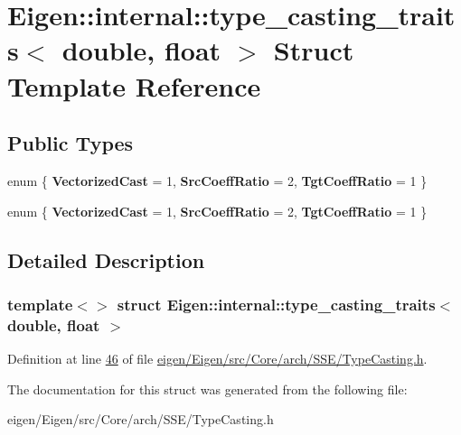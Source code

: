 \hypertarget{struct_eigen_1_1internal_1_1type__casting__traits_3_01double_00_01float_01_4}{}\section{Eigen\+:\+:internal\+:\+:type\+\_\+casting\+\_\+traits$<$ double, float $>$ Struct Template Reference}
\label{struct_eigen_1_1internal_1_1type__casting__traits_3_01double_00_01float_01_4}
\subsection*{Public Types}
\begin{DoxyCompactItemize}
\item 
\mbox{\label{struct_eigen_1_1internal_1_1type__casting__traits_3_01double_00_01float_01_4_a391e4ad9dd16a228b808ac3b1860d519}} 
enum \{ {\bfseries Vectorized\+Cast} = 1, 
{\bfseries Src\+Coeff\+Ratio} = 2, 
{\bfseries Tgt\+Coeff\+Ratio} = 1
 \}
\item 
\mbox{\label{struct_eigen_1_1internal_1_1type__casting__traits_3_01double_00_01float_01_4_a457e967f05eeff827118f23f7ddcebc9}} 
enum \{ {\bfseries Vectorized\+Cast} = 1, 
{\bfseries Src\+Coeff\+Ratio} = 2, 
{\bfseries Tgt\+Coeff\+Ratio} = 1
 \}
\end{DoxyCompactItemize}


\subsection{Detailed Description}
\subsubsection*{template$<$$>$\newline
struct Eigen\+::internal\+::type\+\_\+casting\+\_\+traits$<$ double, float $>$}



Definition at line \hyperlink{eigen_2_eigen_2src_2_core_2arch_2_s_s_e_2_type_casting_8h_source_l00046}{46} of file \hyperlink{eigen_2_eigen_2src_2_core_2arch_2_s_s_e_2_type_casting_8h_source}{eigen/\+Eigen/src/\+Core/arch/\+S\+S\+E/\+Type\+Casting.\+h}.



The documentation for this struct was generated from the following file\+:\begin{DoxyCompactItemize}
\item 
eigen/\+Eigen/src/\+Core/arch/\+S\+S\+E/\+Type\+Casting.\+h\end{DoxyCompactItemize}
